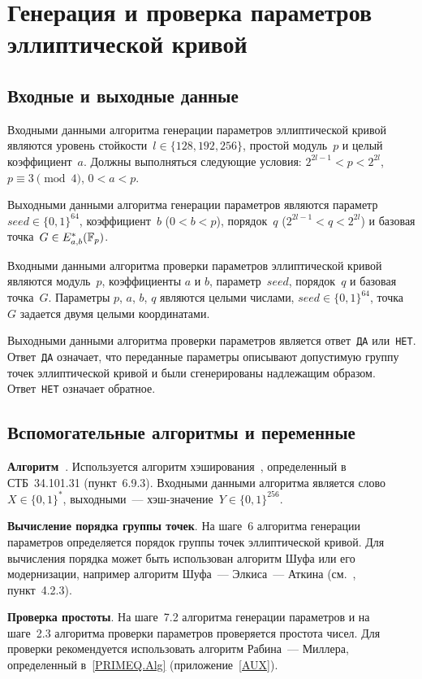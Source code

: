 \section{Генерация и проверка параметров эллиптической кривой}\label{PARAMS}

\subsection{Входные и выходные данные}

Входными данными алгоритма генерации параметров эллиптической кривой 
являются уровень стойкости~$l\in\{128,192,256\}$, 
простой модуль~$p$ и целый коэффициент~$a$.
%
Должны выполняться следующие условия: $2^{2l-1}<p<2^{2l}$,
$p\equiv 3\pmod{4}$, $0<a<p$.

Выходными данными алгоритма генерации параметров 
являются параметр~$seed\in\{0,1\}^{64}$, 
коэффициент~$b$ ($0<b<p$), 
порядок~$q$ ($2^{2l-1}<q<2^{2l}$) 
и базовая точка~$G\in E_{a,b}^*(\mathbb{F}_p)$.

Входными данными алгоритма проверки параметров эллиптической кривой
являются модуль~$p$, коэффициенты $a$ и $b$, 
параметр~$seed$, порядок~$q$ и базовая точка~$G$.
%
Параметры $p$, $a$, $b$, $q$ являются целыми числами,
$seed\in\{0,1\}^{64}$, точка~$G$ задается двумя целыми координатами.

Выходными данными алгоритма проверки параметров 
является ответ~\texttt{ДА} или~\texttt{НЕТ}. 
Ответ~\texttt{ДА} означает, что переданные параметры 
описывают допустимую группу точек эллиптической кривой
и были сгенерированы надлежащим образом.
Ответ~\texttt{НЕТ} означает обратное.

\subsection{Вспомогательные алгоритмы и переменные}
\label{PARAMS.Aux}

{\bf Алгоритм~}.
Используется алгоритм хэширования~,
определенный в СТБ~34.101.31 (пункт~6.9.3).
Входными данными алгоритма является слово~$X\in\{0,1\}^*$,
выходными~--- хэш-значение~$Y\in\{0,1\}^{256}$.

{\bf Вычисление порядка группы точек}.
На шаге~6 алгоритма генерации параметров 
определяется порядок группы точек эллиптической кривой.
%
Для вычисления порядка может быть использован алгоритм Шуфа
или его модернизации, например алгоритм Шуфа~--- Элкиса~--- Аткина
(см.~\cite{ECC}, пункт~4.2.3).

{\bf Проверка простоты}.
На шаге~7.2 алгоритма генерации параметров и на шаге~2.3
алгоритма проверки параметров проверяется простота чисел.
%
Для проверки рекомендуется использовать алгоритм 
Рабина~--- Миллера, определенный в~\ref{PRIMEQ.Alg}
(приложение~\ref{AUX}).

